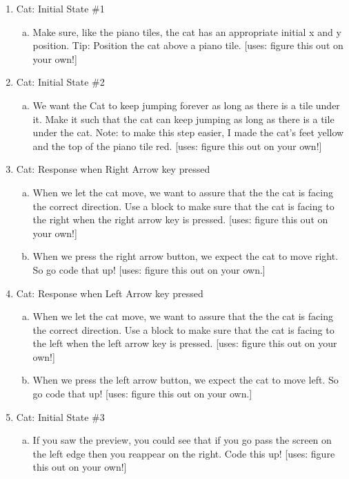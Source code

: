 \documentclass[11pt]{article}
\begin{document}
\begin{enumerate}
\item Cat: Initial State \#1
\begin{enumerate}[a.]
\item Make sure, like the piano tiles, the cat has an appropriate initial x and y position. Tip: Position the cat above a piano tile. [uses: figure this out on your own!]
\end{enumerate}

\item Cat: Initial State \#2
\begin{enumerate}[a.]
\item We want the Cat to keep jumping forever as long as there is a tile under it. Make it such that the cat can keep jumping as long as there is a tile under the cat. Note: to make this step easier, I made the cat's feet yellow and the top of the piano tile red. [uses: figure this out on your own!]
\end{enumerate}

\item Cat: Response when Right Arrow key pressed
\begin{enumerate}[a.]
\item When we let the cat move, we want to assure that the the cat is facing the correct direction. Use a block to make sure that the cat is facing to the right when the right arrow key is pressed. [uses: figure this out on your own!]

\item When we press the right arrow button, we expect the cat to move right. So go code that up! [uses: figure this out on your own.]
\end{enumerate}

\item Cat: Response when Left Arrow key pressed
\begin{enumerate}[a.]
\item When we let the cat move, we want to assure that the the cat is facing the correct direction. Use a block to make sure that the cat is facing to the left when the left arrow key is pressed. [uses: figure this out on your own!]

\item When we press the left arrow button, we expect the cat to move left. So go code that up! [uses: figure this out on your own.]
\end{enumerate}
\newpage
\item Cat: Initial State \#3
\begin{enumerate}[a.]
\item If you saw the preview, you could see that if you go pass the screen on the left edge then you reappear on the right. Code this up! [uses: figure this out on your own!]
\end{enumerate}


\end{enumerate}
\end{document}
